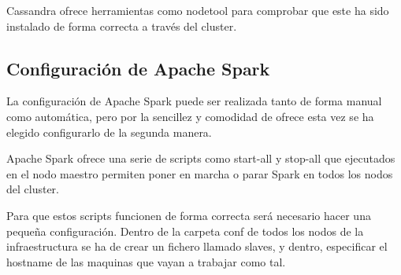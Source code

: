 Cassandra ofrece herramientas como nodetool para comprobar que este ha sido instalado de forma correcta a través del cluster.


\subsection{Configuración de Apache Spark}

La configuración de Apache Spark puede ser realizada tanto de forma manual como automática, pero por la sencillez y comodidad de ofrece esta vez se ha elegido configurarlo de la segunda manera.

Apache Spark ofrece una serie de scripts como start-all y stop-all que ejecutados en el nodo maestro permiten poner en marcha o parar Spark en todos los nodos del cluster.

Para que estos scripts funcionen de forma correcta será necesario hacer una pequeña configuración. Dentro de la carpeta conf de todos los nodos de la infraestructura se ha de crear un fichero llamado slaves, y dentro, especificar el hostname de las maquinas que vayan a trabajar como tal.


